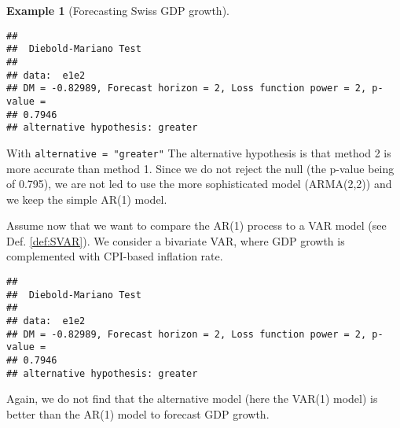 \documentclass[
  12pt,
]{book}
\newenvironment{Shaded}{\begin{snugshade}}{\end{snugshade}}
\newcommand{\AttributeTok}[1]{\textcolor[rgb]{0.77,0.63,0.00}{#1}}
\newcommand{\ConstantTok}[1]{\textcolor[rgb]{0.00,0.00,0.00}{#1}}
\newcommand{\ControlFlowTok}[1]{\textcolor[rgb]{0.13,0.29,0.53}{\textbf{#1}}}
\newcommand{\DecValTok}[1]{\textcolor[rgb]{0.00,0.00,0.81}{#1}}
\newcommand{\FloatTok}[1]{\textcolor[rgb]{0.00,0.00,0.81}{#1}}
\newcommand{\FunctionTok}[1]{\textcolor[rgb]{0.00,0.00,0.00}{#1}}
\newcommand{\NormalTok}[1]{#1}
\newcommand{\OtherTok}[1]{\textcolor[rgb]{0.56,0.35,0.01}{#1}}
\newcommand{\SpecialCharTok}[1]{\textcolor[rgb]{0.00,0.00,0.00}{#1}}
\newcommand{\StringTok}[1]{\textcolor[rgb]{0.31,0.60,0.02}{#1}}
\theoremstyle{definition}
\theoremstyle{definition}
\newtheorem{example}{Example}[chapter]
\theoremstyle{definition}
\theoremstyle{definition}
\theoremstyle{remark}
\begin{document}
\begin{example}[Forecasting Swiss GDP growth]
\begin{verbatim}
## 
##  Diebold-Mariano Test
## 
## data:  e1e2
## DM = -0.82989, Forecast horizon = 2, Loss function power = 2, p-value =
## 0.7946
## alternative hypothesis: greater
\end{verbatim}

With \texttt{alternative\ =\ "greater"} The alternative hypothesis is that method 2 is more accurate than method 1. Since we do not reject the null (the p-value being of 0.795), we are not led to use the more sophisticated model (ARMA(2,2)) and we keep the simple AR(1) model.

Assume now that we want to compare the AR(1) process to a VAR model (see Def. \ref{def:SVAR}). We consider a bivariate VAR, where GDP growth is complemented with CPI-based inflation rate.

\begin{Shaded}
\end{Shaded}

\begin{verbatim}
## 
##  Diebold-Mariano Test
## 
## data:  e1e2
## DM = -0.82989, Forecast horizon = 2, Loss function power = 2, p-value =
## 0.7946
## alternative hypothesis: greater
\end{verbatim}

Again, we do not find that the alternative model (here the VAR(1) model) is better than the AR(1) model to forecast GDP growth.
\end{example}
\end{document}
